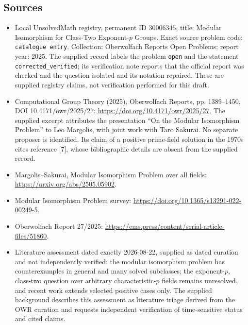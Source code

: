 \documentclass[11pt]{article}
\begin{document}
\subsection{Sources}
\begin{itemize}
\item Local UnsolvedMath registry, permanent ID \(30006345\), title: Modular Isomorphism for Class-Two Exponent-\(p\) Groups. Exact source problem code: \texttt{catalogue entry}. Collection: Oberwolfach Reports Open Problems; report year: 2025. The supplied record labels the problem \texttt{open} and the statement \texttt{corrected\_verified}; its verification note reports that the official report was checked and the question isolated and its notation repaired. These are supplied registry claims, not verification performed for this draft.
\item Computational Group Theory (2025), Oberwolfach Reports, pp. 1389--1450, DOI 10.4171/owr/2025/27: \url{https://doi.org/10.4171/owr/2025/27}. The supplied excerpt attributes the presentation ``On the Modular Isomorphism Problem'' to Leo Margolis, with joint work with Taro Sakurai. No separate proposer is identified. Its claim of a positive prime-field solution in the 1970s cites reference [7], whose bibliographic details are absent from the supplied record.
\item Margolis--Sakurai, Modular Isomorphism Problem over all fields: \url{https://arxiv.org/abs/2505.05902}.
\item Modular Isomorphism Problem survey: \url{https://doi.org/10.1365/s13291-022-00249-5}.
\item Oberwolfach Report 27/2025: \url{https://ems.press/content/serial-article-files/51860}.
\item Literature assessment dated exactly 2026-08-22, supplied as dated curation and not independently verified: the modular isomorphism problem has counterexamples in general and many solved subclasses; the exponent-\(p\), class-two question over arbitrary characteristic-\(p\) fields remains unresolved, and recent work extends selected positive cases only. The supplied background describes this assessment as literature triage derived from the OWR curation and requests independent verification of time-sensitive status and cited claims.
\end{itemize}
\end{document}
